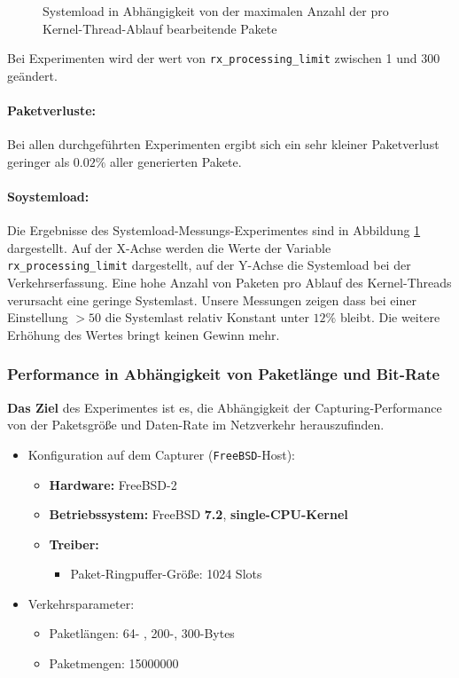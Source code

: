 {\begin{figure}
\caption{Systemload in Abhängigkeit von der maximalen Anzahl der pro Kernel-Thread-Ablauf
bearbeitende Pakete}
\label{img:plot_sysload_kts}
\end{figure} 
Bei Experimenten wird der wert von \verb+rx_processing_limit+ zwischen 1 und 300 
geändert.
\paragraph*{Paketverluste:} 
Bei allen durchgeführten Experimenten ergibt sich ein sehr kleiner Paketverlust
geringer als $0.02\%$ aller generierten Pakete.
\paragraph*{Soystemload:}
Die Ergebnisse des Systemload-Messungs-Experimentes sind in Abbildung
\ref{img:plot_sysload_kts} dargestellt.  Auf der X-Achse werden die Werte der
Variable \verb+rx_processing_limit+ dargestellt, auf der Y-Achse die Systemload
bei der Verkehrserfassung. Eine hohe Anzahl von Paketen pro Ablauf des
Kernel-Threads verursacht eine geringe Systemlast. Unsere Messungen zeigen dass
bei einer Einstellung $>50$ die Systemlast relativ Konstant unter $12\%$ bleibt. 
Die weitere Erhöhung des Wertes bringt keinen Gewinn mehr.
}
\subsubsection*{Performance in Abhängigkeit von Paketlänge und Bit-Rate}
\textbf{Das Ziel} des Experimentes ist es, die Abhängigkeit der
Capturing-Performance von der Paketsgröße und Daten-Rate im Netzverkehr
herauszufinden.
%
\begin{itemize}
\item Konfiguration auf dem Capturer (\verb+FreeBSD+-Host): 
\begin{itemize}
	\item \textbf{Hardware:} FreeBSD-2
	\item \textbf{Betriebssystem:} FreeBSD \textbf{7.2}, \textbf{single-CPU-Kernel}
	\item \textbf{Treiber:} 
		\begin{itemize}
			\item Paket-Ringpuffer-Größe: 1024 Slots
		\end{itemize}
\end{itemize}
\item Verkehrsparameter:
\begin{itemize}
	\item Paketlängen: 64- , 200-, 300-Bytes
	\item Paketmengen: 15000000
\end{itemize}
\end{itemize}
%
